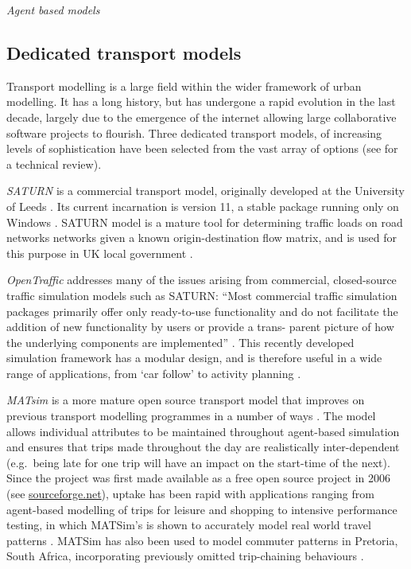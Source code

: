 \emph{Agent based models}
\label{s:agent-based}
\subsection{Dedicated transport models}
\label{s:dedicated}
Transport modelling is a large field within the wider framework of
urban modelling. It has a long history, but has undergone a rapid
evolution in the last decade, largely due to the emergence of the
internet allowing large collaborative software projects to flourish.
Three dedicated transport models, of increasing levels of sophistication
have been selected from the
vast array of options (see \citealp{Rasouli2012} for a technical review).

\emph{SATURN} is a commercial transport model, originally
developed at the University of
Leeds \citep{boxill2000evaluation}. Its current incarnation
is version 11, a stable package running only on Windows \citep{SATURN2012}.
SATURN model is a mature tool for determining traffic loads on road networks
networks given a known origin-destination flow matrix,
and is used for this purpose in UK local government \citep{boyce2005urban}.

\emph{OpenTraffic} addresses many of the issues arising from commercial,
closed-source traffic simulation models such as SATURN: ``Most commercial
traffic simulation packages primarily offer only ready-to-use
functionality and do not facilitate the addition of new
functionality by users or provide a trans- parent picture of how the
underlying components are implemented'' \citep[44]{Tamminga2012}.
This recently developed simulation framework has a modular design,
and is therefore useful in a wide range of applications, from
`car follow' to activity planning \citep{Tamminga2012}.

\emph{MATsim} is a more mature open source transport model that improves
on previous transport modelling programmes in a number of ways
\citep{rieser2007agent}.
The model allows individual attributes to be maintained throughout
agent-based simulation and ensures that trips made throughout the
day are realistically inter-dependent (e.g.~being late for one trip
will have an impact on the start-time of the next).
Since the project was first made available as a free open source project
in 2006 (see \href{http://sourceforge.net/projects/matsim/files/MATSim/}{sourceforge.net}),
uptake has been rapid with applications ranging from agent-based
modelling of trips for leisure and shopping \citep{horni2009location}
to intensive
performance testing, in which MATSim's is shown to accurately
model real world travel patterns \citep{balmer2008agent, gao2010comparison}.
MATSim has also been used to model commuter patterns in Pretoria, South Africa,
incorporating previously omitted trip-chaining behaviours \citep{van2011agent}.


